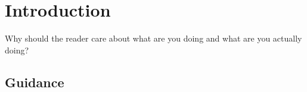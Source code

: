 \documentclass{l4proj}
\begin{document}
%
%
%

%
%
%
%
\chapter{Introduction}




Why should the reader care about what are you doing and what are you actually doing?
\section{Guidance}
\end{document}
